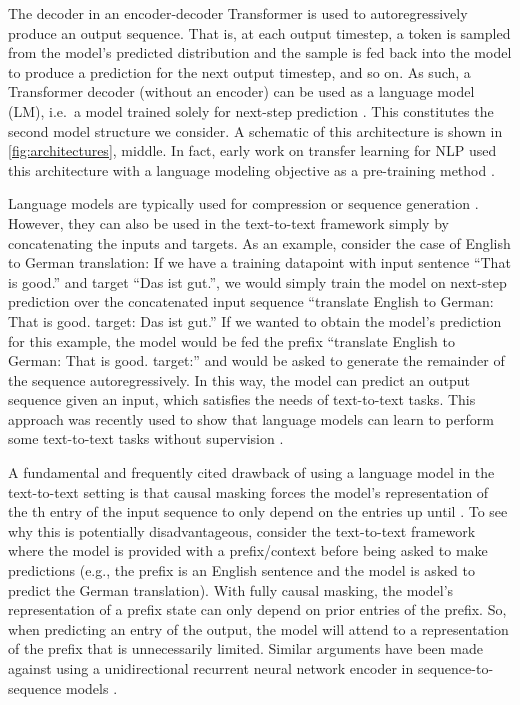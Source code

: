 \documentclass[twoside,11pt]{article}
\begin{document}
The decoder in an encoder-decoder Transformer is used to autoregressively produce an output sequence.
That is, at each output timestep, a token is sampled from the model's predicted distribution and the sample is fed back into the model to produce a prediction for the next output timestep, and so on.
As such, a Transformer decoder (without an encoder) can be used as a language model (LM), i.e.\ a model trained solely for next-step prediction \citep{liu2018generating,radford2018improving,al2019character}.
This constitutes the second model structure we consider.
A schematic of this architecture is shown in \cref{fig:architectures}, middle.
In fact, early work on transfer learning for NLP used this architecture with a language modeling objective as a pre-training method \citep{radford2018improving}.

Language models are typically used for compression or sequence generation \citep{graves2013generating}.
However, they can also be used in the text-to-text framework simply by concatenating the inputs and targets.
As an example, consider the case of English to German translation: If we have a training datapoint with input sentence ``That is good.'' and target ``Das ist gut.'', we would simply train the model on next-step prediction over the concatenated input sequence ``translate English to German: That is good. target: Das ist gut.''
If we wanted to obtain the model's prediction for this example, the model would be fed the prefix ``translate English to German: That is good. target:'' and would be asked to generate the remainder of the sequence autoregressively.
In this way, the model can predict an output sequence given an input, which satisfies the needs of text-to-text tasks.
This approach was recently used to show that language models can learn to perform some text-to-text tasks without supervision \citep{radford2019language}.

A fundamental and frequently cited drawback of using a language model in the text-to-text setting is that causal masking forces the model's representation of the th entry of the input sequence to only depend on the entries up until .
To see why this is potentially disadvantageous, consider the text-to-text framework where the model is provided with a prefix/context before being asked to make predictions (e.g., the prefix is an English sentence and the model is asked to predict the German translation).
With fully causal masking, the model's representation of a prefix state can only depend on prior entries of the prefix.
So, when predicting an entry of the output, the model will attend to a representation of the prefix that is unnecessarily limited.
Similar arguments have been made against using a unidirectional recurrent neural network encoder in sequence-to-sequence models \citep{bahdanau2014neural}.
\end{document}
